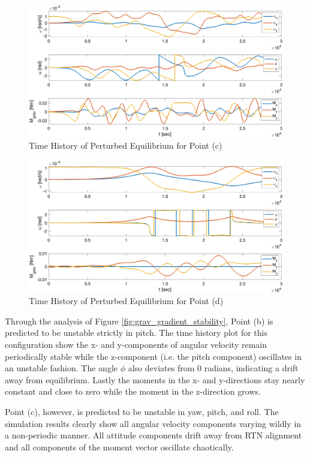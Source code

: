 \begin{figure}[H]
    \centering
    \captionsetup{justification = centering}
    \includegraphics[width = 12cm]{Images/PS5/point_c_grav_stability.png}
    \caption{Time History of Perturbed Equilibrium for Point (c)}
    \label{fig:point_c_grav_stability}
\end{figure}

\begin{figure}[H]
    \centering
    \captionsetup{justification = centering}
    \includegraphics[width = 12cm]{Images/PS5/point_d_grav_stability.png}
    \caption{Time History of Perturbed Equilibrium for Point (d)}
    \label{fig:point_d_grav_stability}
\end{figure}

Through the analysis of Figure \ref{fig:grav_gradient_stability}, Point (b) is predicted to be unstable strictly in pitch. The time history plot for this configuration show the x- and y-components of angular velocity remain periodically stable while the z-component (i.e. the pitch component) oscillates in an unstable fashion. The angle $\phi$ also deviates from 0 radians, indicating a drift away from equilibrium. Lastly the moments in the x- and y-directions stay nearly constant and close to zero while the moment in the z-direction grows.

Point (c), however, is predicted to be unstable in yaw, pitch, and roll. The simulation results clearly show all angular velocity components varying wildly in a non-periodic manner. All attitude components drift away from RTN alignment and all components of the moment vector oscillate chaotically.


